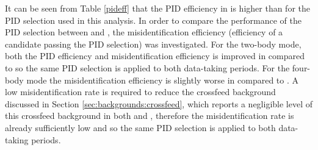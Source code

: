 It can be seen from Table \ref{pideff} that the PID efficiency in \runtwo is higher than \runone for the PID selection used in this analysis. In order to compare the performance of the PID selection between \runone and \runtwo, the misidentification efficiency (efficiency of a \kpi candidate passing the \pik PID selection) was investigated. For the two-body mode, both the PID efficiency and misidentification efficiency is improved in \runtwo compared to \runone so the same PID selection is applied to both data-taking periods. For the four-body mode the misidentification efficiency is slightly worse in \runtwo compared to \runone. A low misidentification rate is required to reduce the crossfeed background discussed in Section \ref{sec:backgrounds:crossfeed}, which reports a negligible level of this crossfeed background in both \runone and \runtwo, therefore the misidentification rate is already sufficiently low and so the same PID selection is applied to both data-taking periods.

